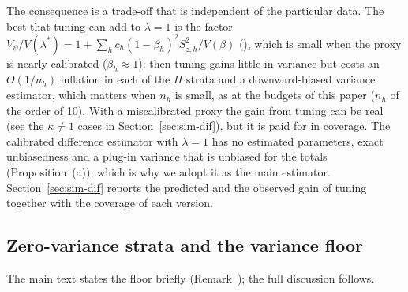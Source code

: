 The consequence is a trade-off that is independent of the particular data. The best that tuning can add to $\lambda=1$ is the factor
$V_\psi/V(\lambda^\ast)=1+\sum_hc_h(1-\beta_h)^2S^2_{\tilde z,h}/V(\beta)$ (), which is small when the proxy is nearly calibrated ($\beta_h\approx1$): then
tuning gains little in variance but costs an $O(1/n_h)$ inflation in each of the $H$ strata and a downward-biased variance estimator, which matters when $n_h$ is small, as
at the budgets of this paper ($n_h$ of the order of 10). With a miscalibrated proxy the gain from tuning can be real (see the $\kappa\ne1$ cases in
Section~\ref{sec:sim-dif}), but it is paid for in coverage. The calibrated difference estimator with $\lambda=1$ has no estimated
parameters, exact unbiasedness and a plug-in variance that is unbiased for the totals (Proposition~(a)), which is why we adopt it as the main
estimator. Section~\ref{sec:sim-dif} reports the predicted and the observed gain of tuning together with the coverage of each version.

\subsection{Zero-variance strata and the variance floor}\label{si:theory-floor}

The main text states the floor briefly (Remark~); the full discussion follows.

